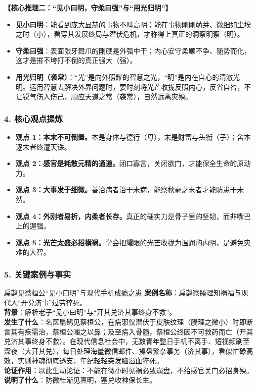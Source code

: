 \noindent\textbf{【核心推理二：“见小曰明，守柔曰强”与“用光归明”】}
\begin{itemize}
    \item \textbf{见小曰明}：能看到庞大显赫的事物不叫高明；能在事物刚刚萌芽、微细如尘埃之时（小），看穿其发展终局与潜伏危机，才称得上真正的洞察明察（明）。
    \item \textbf{守柔曰强}：表面张牙舞爪的刚硬是外强中干；内心安守柔顺不争、随势而化，这才是摧不垮打不倒的真正强大（强）。
    \item \textbf{用光归明（袭常）}：“光”是向外照耀的智慧之光，“明”是内在自心的清澈光明。运用智慧去解决外界问题时，要时刻将光芒收拢反照内心，反省自咎，不让锐气伤人伤己，顺应天道之常（袭常），自然远离灾殃。
\end{itemize}

\subsubsection{4. 核心观点提炼}
\begin{itemize}
    \item \textbf{观点 1：本末不可倒置。}本是身体与德行（母），末是财富与头衔（子）；舍本逐末者终遭天诛。
    \item \textbf{观点 2：感官是耗散元精的通道。}闭口寡言，关闭欲门，才能保全生命的原动力。
    \item \textbf{观点 3：大事发于细微。}善治病者治于未病，能察秋毫之末者才能防患于未然。
    \item \textbf{观点 4：外刚者易折，内柔者长存。}真正的硬实力是骨子里的坚韧，而非嘴巴上的逞强。
    \item \textbf{观点 5：光芒太盛必招横祸。}学会把耀眼的光芒收拢为温润的内明，是避免灾难的大智。
\end{itemize}

\subsubsection{5. 关键案例与事实}
\begin{CaseBox}{扁鹊见蔡桓公“见小曰明”与现代手机成瘾之患}
\textbf{案例名称}：扁鹊察腠理知祸福与现代人“开兑济事”过劳猝死。\\
\textbf{背景}：解析老子“见小曰明”与“开其兑济其事终身不救”。\\
\textbf{发生了什么}：名医扁鹊见蔡桓公，在病邪仅潜伏于皮肤纹理（腠理之微小）时即断言其有疾需治，蔡桓公嗤之以鼻；及至病入骨髓，蔡桓公终因不可救药而亡（开其兑济其事终身不救）。在现代信息社会中，无数青年整日手机不离手、短视频刷至深夜（大开其兑），每日处理海量微信邮件、操盘繁杂事务（济其事），看似忙碌高效，实则神魂彻底透支，年纪轻轻突发脑溢血猝死。\\
\textbf{论证作用}：以此生动论证：不能在微小时见祸必致崩盘，不给感官关门必招身殃。\\
\textbf{说明了什么}：防微杜渐见真明，塞兑收神保长生。
\end{CaseBox}

